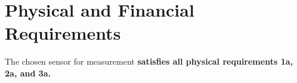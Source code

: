 \section*{Physical and Financial Requirements}
The chosen sensor for measurement \textbf{satisfies all physical requirements 1a, 2a, and 3a.}